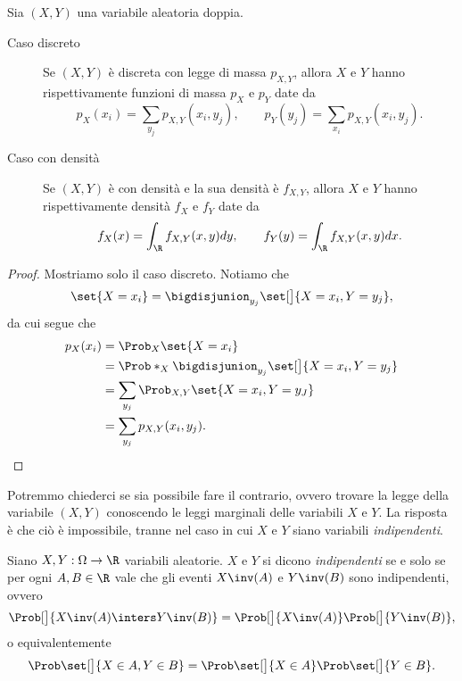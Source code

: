 \begin{proposition}
    Sia $(X, Y)$ una variabile aleatoria doppia.
    \begin{description}
        \item[Caso discreto] Se $(X, Y)$ è discreta con legge di massa $p_{X, Y}$, allora $X$ e $Y$ hanno rispettivamente funzioni di massa $p_X$ e $p_Y$ date da \[
            p_X(x_i) = \sum_{y_j}p_{X, Y}(x_i, y_j), \qquad  p_Y(y_j) = \sum_{x_i}p_{X, Y}(x_i, y_j).
        \]
        \item[Caso con densità] Se $(X, Y)$ è con densità e la sua densità è $f_{X, Y}$, allora $X$ e $Y$ hanno rispettivamente densità $f_X$ e $f_Y$ date da \[
            f_X(x) = \int_{\R}f_{X, Y}(x, y)dy, \qquad  f_Y(y) = \int_{\R}f_{X, Y}(x, y)dx.
        \]
    \end{description}
\end{proposition}
\begin{proof}
    Mostriamo solo il caso discreto. Notiamo che \[
        \set{X = x_i} = \bigdisjunion_{y_j} \set[\big]{X = x_i, Y = y_j},    
    \] da cui segue che \begin{align*}
        p_X(x_i) &= \Prob_{X}\set{X=x_i}\\
        &= \Prob*_{X}{\bigdisjunion_{y_j} \set[\big]{X = x_i, Y = y_j}}\\
        &= \sum_{y_j} \Prob_{X, Y}\set{X = x_i, Y = y_J}\\
        &= \sum_{y_j} p_{X, Y}(x_i, y_j). \qedhere
    \end{align*}
\end{proof}

Potremmo chiederci se sia possibile fare il contrario, ovvero trovare la legge della variabile $(X, Y)$ conoscendo le leggi marginali delle variabili $X$ e $Y$. La risposta è che ciò è impossibile, tranne nel caso in cui $X$ e $Y$ siano variabili \emph{indipendenti}.

\begin{definition}
    Siano $X, Y : \Omega \to \R$ variabili aleatorie. $X$ e $Y$ si dicono \emph{indipendenti} se e solo se per ogni $A, B \in \R$ vale che gli eventi $X\inv(A)$ e $Y\inv(B)$ sono indipendenti, ovvero \[
        \Prob[\big]{X\inv(A) \inters Y\inv(B)} = \Prob[\big]{X\inv(A)}\Prob[\big]{Y\inv(B)},    
    \] o equivalentemente \[
        \Prob\set[\big]{X \in A, Y \in B} = \Prob\set[\big]{X \in A}\Prob\set[\big]{Y \in B}.     
    \]
\end{definition}

